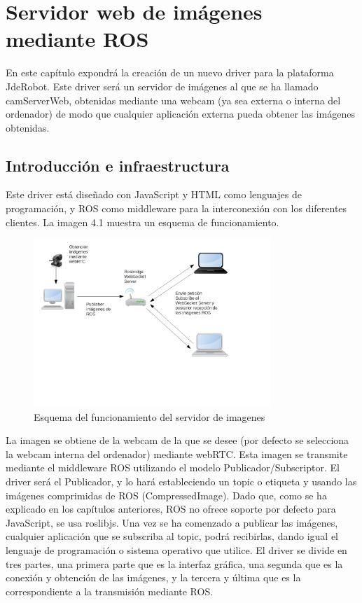 \chapter{Servidor web de imágenes mediante ROS }\label{cap.camserver}
En este capítulo expondrá la creación de un nuevo driver para la plataforma JdeRobot. Este driver será un servidor de imágenes al que se ha llamado camServerWeb, obtenidas mediante una webcam (ya sea externa o interna del ordenador) de modo que cualquier aplicación externa pueda obtener las imágenes obtenidas.
\section{Introducción e infraestructura}
Este driver está diseñado con JavaScript y HTML como lenguajes de programación, y ROS como middleware para la interconexión con los diferentes clientes. La imagen 4.1 muestra un esquema de funcionamiento.
\begin{figure}[H]
  \begin{center}
    \includegraphics[width=0.8\textwidth]{figures/esquemacamserver.png}
		\caption{Esquema del funcionamiento del servidor de imagenes}
		\label{fig.esquemacamserver}
		\end{center}
\end{figure}
La imagen se obtiene de la webcam de la que se desee (por defecto se selecciona la webcam interna del ordenador) mediante webRTC. Esta imagen se transmite mediante el middleware ROS utilizando el modelo Publicador/Subscriptor. El driver será el Publicador, y lo hará estableciendo un topic o etiqueta y usando las imágenes comprimidas de ROS (CompressedImage). Dado que, como se ha explicado en los capítulos anteriores, ROS no ofrece soporte por defecto para JavaScript, se usa roslibjs.
Una vez se ha comenzado a publicar las imágenes, cualquier aplicación que se subscriba al topic, podrá recibirlas, dando igual el lenguaje de programación o sistema operativo que utilice.
El driver se divide en tres partes, una primera parte que es la interfaz gráfica, una segunda que es la conexión y obtención de las imágenes, y la tercera y última que es la correspondiente a la transmisión mediante ROS.
